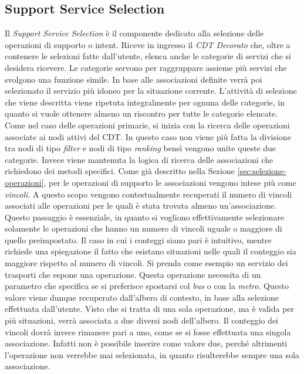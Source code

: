 \subsection{Support Service Selection\label{sec:support-service-selection}}

Il \emph{Support Service Selection} è il componente dedicato alla selezione delle operazioni di supporto o intent. Riceve in ingresso il \emph{CDT Decorato} che, oltre a contenere le selezioni fatte dall'utente, elenca anche le categorie di servizi che si desidera ricevere. Le categorie servono per raggruppare assieme più servizi che svolgono una funzione simile. In base alle associazioni definite verrà poi selezionato il servizio più idoneo per la situazione corrente. L'attività di selezione che viene descritta viene ripetuta integralmente per ognuna delle categorie, in quanto si vuole ottenere almeno un riscontro per tutte le categorie elencate. Come nel caso delle operazioni primarie, si inizia con la ricerca delle operazioni associate ai nodi attivi del CDT. In questo caso non viene più fatta la divisione tra nodi di tipo \emph{filter} e nodi di tipo \emph{ranking} bensì vengono unite queste due categorie. Invece viene mantenuta la logica di ricerca delle associazioni che richiedono dei metodi specifici. Come già descritto nella Sezione \ref{sec:selezione-operazioni}, per le operazioni di supporto le associazioni vengono intese più come \emph{vincoli}. A questo scopo vengono contestualmente recuperati il numero di vincoli associati alle operazioni per le quali è stata trovata almeno un'associazione. Questo passaggio è essenziale, in quanto si vogliono effettivamente selezionare solamente le operazioni che hanno un numero di vincoli uguale o maggiore di quello preimpostato. Il caso in cui i conteggi siano pari è intuitivo, mentre richiede una spiegazione il fatto che esistano situazioni nelle quali il conteggio sia maggiore rispetto al numero di vincoli. Si prenda come esempio un servizio dei trasporti che espone una operazione. Questa operazione necessita di un parametro che specifica se si preferisce spostarsi col \emph{bus} o con la \emph{metro}. Questo valore viene dunque recuperato dall'albero di contesto, in base alla selezione effettuata dall'utente. Visto che si tratta di una sola operazione, ma è valida per più situazioni, verrà associata a due diversi nodi dell'albero. Il conteggio dei vincoli dovrà invece rimanere pari a uno, come se si fosse effettuata una singola associazione. Infatti non è possibile inserire come valore due, perché altrimenti l'operazione non verrebbe mai selezionata, in quanto risulterebbe sempre una sola associazione.

